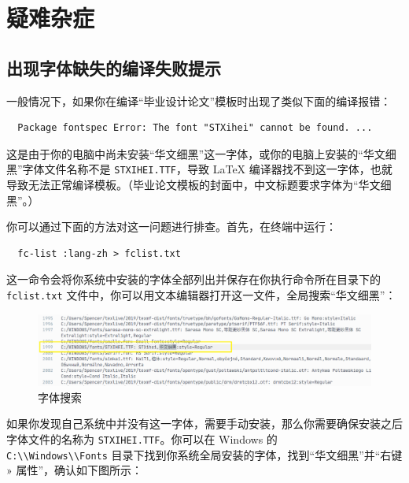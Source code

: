 \section{疑难杂症} \label{sec:troubleshooting}

\subsection{出现字体缺失的编译失败提示}

一般情况下，如果你在编译“毕业设计论文”模板时出现了类似下面的编译报错：

\begin{verbatim}
  Package fontspec Error: The font "STXihei" cannot be found. ...
\end{verbatim}

这是由于你的电脑中尚未安装“华文细黑”这一字体，或你的电脑上安装的“华文细黑”字体文件名称不是 \texttt{STXIHEI.TTF}，导致 {\LaTeX} 编译器找不到这一字体，也就导致无法正常编译模板。（毕业论文模板的封面中，中文标题要求字体为“华文细黑”。）

你可以通过下面的方法对这一问题进行排查。首先，在终端中运行：

\begin{verbatim}
  fc-list :lang-zh > fclist.txt
\end{verbatim}

这一命令会将你系统中安装的字体全部列出并保存在你执行命令所在目录下的 \texttt{fclist.txt} 文件中，你可以用文本编辑器打开这一文件，全局搜索“华文细黑”：

\begin{figure}[H]
  \centering
  \includegraphics[width=\textwidth]{images/search_font.png}
  \caption{字体搜索}
  \label{search_font}
\end{figure}

如果你发现自己系统中并没有这一字体，需要手动安装，那么你需要确保安装之后字体文件的名称为 \texttt{STXIHEI.TTF}。你可以在 Windows 的\\ \texttt{C:\textbackslash\textbackslash Windows\textbackslash\textbackslash Fonts} 目录下找到你系统全局安装的字体，找到“华文细黑”并“右键 » 属性”，确认如下图所示：


